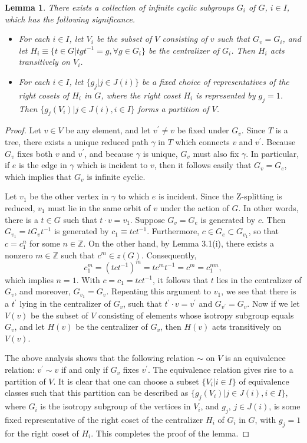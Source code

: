 \documentclass[11pt]{amsart}
\theoremstyle{plain}
\numberwithin{theorem}{section}
\newtheorem{lemma}[theorem]{Lemma}
\theoremstyle{definition}
\begin{document}
\begin{lemma}
There exists a collection of infinite cyclic subgroups $G_i$ of $G$, $i\in I$,  which has the following significance.
\begin{itemize}
\item For each $i\in I$, let $V_i$ be the subset of $V$ consisting of $v$ such that $G_v=G_i$, 
and let $H_i\equiv \{t\in G|tgt^{-1}=g, \forall g\in G_i\}$ be the centralizer of $G_i$. Then 
$H_i$ acts transitively on $V_i$.
\item For each $i\in I$, let $\{g_j|j\in J(i)\}$ be a fixed choice of representatives of the right cosets
of $H_i$ in $G$, where the right coset $H_i$ is represented by $g_j=1$. Then 
$\{g_j(V_i)| j\in J(i), i\in I\}$ forms a partition of $V$. 
\end{itemize}
\end{lemma}

\begin{proof}
Let $v\in V$ be any element, and let $v^\prime\neq v$ be fixed under $G_v$. Since $T$ is a tree,
there exists a unique reduced path $\gamma$ in $T$ which connects $v$ and $v^\prime$. 
Because $G_v$ fixes both $v$ and $v^\prime$, and because $\gamma$ is unique, $G_v$ must
also fix $\gamma$. In particular, if $e$ is the edge in $\gamma$ which is incident to $v$, then
it follows easily that $G_v=G_e$, which implies that $G_v$ is infinite cyclic. 

Let $v_1$ be the other vertex in $\gamma$ to which $e$ is incident. Since the Z-splitting is 
reduced, $v_1$ must lie in the same orbit of $v$ under the action of $G$. In other words, there
is a $t\in G$ such that $t\cdot v=v_1$. Suppose $G_v=G_e$ is generated by $c$. Then
$G_{v_1}=tG_v t^{-1}$ is generated by $c_1\equiv tct^{-1}$. Furthermore, $c\in G_e\subset
G_{v_1}$, so that $c=c_1^n$ for some $n\in {{\mathbb Z}}$. On the other hand, by Lemma 3.1(i), there exists 
a nonzero $m\in {{\mathbb Z}}$ such that $c^m\in z(G)$. Consequently, 
$$
c_1^m=(tct^{-1})^m=tc^m t^{-1}=c^m=c_1^{nm},
$$
which implies $n=1$. With $c=c_1=tct^{-1}$, it follows that $t$ lies in the centralizer
of $G_v$, and moreover, $G_{v_1}=G_v$. Repeating this argument to $v_1$, we see that
there is a $t^\prime$ lying in the centralizer of $G_v$, such that $t^\prime \cdot v=v^\prime$
and $G_{v^\prime}=G_v$. Now if we let $V(v)$ be the subset of $V$ consisting of elements 
whose isotropy subgroup equals $G_v$, and let $H(v)$ be the centralizer of $G_v$, then
$H(v)$ acts transitively on $V(v)$. 

The above analysis shows that the following relation $\sim$ on $V$ is an equivalence relation:
$v^\prime\sim v$ if and only if $G_v$ fixes $v^\prime$. The equivalence relation gives rise to
a partition of $V$. It is clear that one can choose a subset $\{V_i|i\in I\}$ of equivalence classes
such that this partition can be described as $\{g_j(V_i)| j\in J(i), i\in I\}$, where $G_i$ is the
isotropy subgroup of the vertices in $V_i$, and $g_j$, $j\in J(i)$, is some fixed representative
of the right coset of the centralizer $H_i$ of $G_i$ in $G$, with $g_j=1$ for the right coset of
$H_i$.  This completes the proof of the lemma. 

\end{proof}
\end{document}

